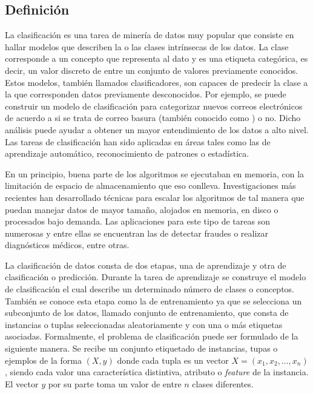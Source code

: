 \subsection{Definición}
\label{clasificacion}

La clasificación es una tarea de minería de datos muy popular que consiste en
hallar modelos que describen la o las clases intrínsecas de los datos. La clase
corresponde a un concepto que representa al dato y es una etiqueta categórica,
es decir, un valor discreto de entre un conjunto de valores previamente
conocidos. Estos modelos, también llamados clasificadores, son capaces de
predecir la clase a la que corresponden datos previamente desconocidos. Por
ejemplo, se puede construir un modelo de clasificación para categorizar nuevos
correos electrónicos  de acuerdo a si se trata de correo basura (también
conocido como ) o no. Dicho análisis puede ayudar a
obtener un mayor entendimiento de los datos a alto nivel. Las tareas de
clasificación han sido aplicadas en áreas tales como las de aprendizaje
automático, reconocimiento de patrones o estadística.

En un principio, buena parte de los algoritmos se ejecutaban en memoria, con la
limitación de espacio de almacenamiento que eso conlleva. Investigaciones más
recientes han desarrollado técnicas para escalar los algoritmos de tal manera
que puedan manejar datos de mayor tamaño, alojados en memoria, en disco o
procesados bajo demanda. Las aplicaciones para este tipo de tareas son numerosas
y entre ellas se encuentran las de detectar fraudes o realizar diagnósticos
médicos, entre otras.

La clasificación de datos consta de dos etapas, una de aprendizaje y otra de
clasificación o predicción. Durante la tarea de aprendizaje se construye el
modelo de clasificación  el cual describe un determinado número de clases o
conceptos. También se conoce esta etapa como la de entrenamiento ya que se
selecciona un subconjunto de los datos, llamado conjunto de entrenamiento, que
consta de instancias o tuplas seleccionadas aleatoriamente y con una o más
etiquetas asociadas. Formalmente, el problema de clasificación puede ser
formulado de la siguiente manera. Se recibe un conjunto etiquetado de
instancias, tupas o ejemplos de la forma $( X, y )$ donde cada tupla es un
vector $X=(x_{1},x_{2},\dots,x_{n})$, siendo cada valor una característica
distintiva, atributo o \textit{feature} de la instancia. El vector $y$ por su
parte toma un valor de entre $n$ clases diferentes.

